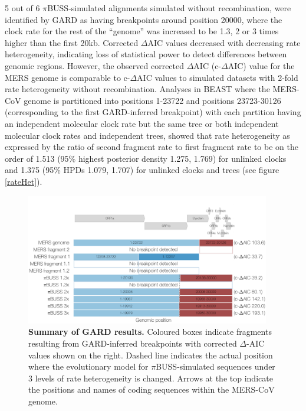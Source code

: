 \documentclass[11pt,oneside,letterpaper]{article}
\begin{document}
5 out of 6 $\pi$BUSS-simulated alignments simulated without recombination, were identified by GARD as having breakpoints around position 20000, where the clock rate for the rest of the ``genome'' was increased to be 1.3, 2 or 3 times higher than the first 20kb.
Corrected $\Delta$AIC values decreased with decreasing rate heterogeneity, indicating loss of statistical power to detect differences between genomic regions.
However, the observed corrected $\Delta$AIC (c-$\Delta$AIC) value for the MERS genome is comparable to c-$\Delta$AIC values to simulated datasets with 2-fold rate heterogeneity without recombination.
Analyses in BEAST where the MERS-CoV genome is partitioned into positions 1-23722 and positions 23723-30126 (corresponding to the first GARD-inferred breakpoint) with each partition having an independent molecular clock rate but the same tree or both independent molecular clock rates and independent trees, showed that rate heterogeneity as expressed by the ratio of second fragment rate to first fragment rate to be on the order of 1.513 (95\% highest posterior density 1.275, 1.769) for unlinked clocks and 1.375 (95\% HPDs 1.079, 1.707) for unlinked clocks and trees (see figure \ref{rateHet}).

\begin{figure}[h]
	\centering
	\includegraphics[width=0.95\textwidth]{figures/MERS_GARD_summary.png}
	\caption{\textbf{Summary of GARD results.}
Coloured boxes indicate fragments resulting from GARD-inferred breakpoints with corrected $\Delta$-AIC values shown on the right.
Dashed line indicates the actual position where the evolutionary model for $\pi$BUSS-simulated sequences under 3 levels of rate heterogeneity is changed.
Arrows at the top indicate the positions and names of coding sequences within the MERS-CoV genome.}
	\label{gard}
\end{figure}
\end{document}
